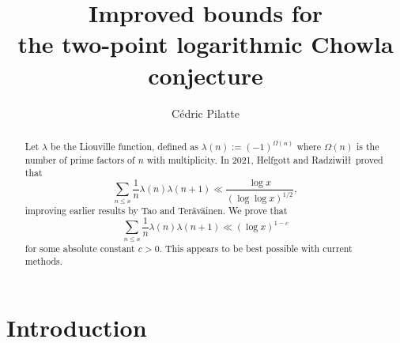 \documentclass[11pt]{amsart}
\theoremstyle{definition}
\renewcommand{\leq}{\leqslant}
\begin{document}
\title[Improved bounds for the two-point logarithmic {C}howla conjecture]{Improved bounds for \\the two-point logarithmic Chowla conjecture}

\author{C\'edric Pilatte}
\address{Mathematical Institute, University of Oxford.}



\maketitle


\begin{abstract}
Let $\lambda$ be the Liouville function, defined as $\lambda(n) := (-1)^{\Omega(n)}$ where $\Omega(n)$ is the number of prime factors of $n$ with multiplicity. In 2021, Helfgott and Radziwi\l\l~proved that 
\begin{equation*}
	\sum_{n\leq x} \frac{1}{n}\lambda(n) \lambda(n+1) \ll \frac{\log x}{(\log \log x)^{1/2}},
\end{equation*}
improving earlier results by Tao and Teräväinen. We prove that
\begin{equation*}
	 \sum_{n\leq x} \frac 1n \lambda(n) \lambda(n+1) \ll (\log x)^{1-c}
\end{equation*}
for some absolute constant $c>0$. This appears to be best possible with current methods.
\end{abstract}


%

{
  \vspace{2.4cm}
  \hypersetup{linkcolor=black}
  \tableofcontents
}


\parindent 0pt
\parskip 5pt





\section{Introduction}
\end{document}
